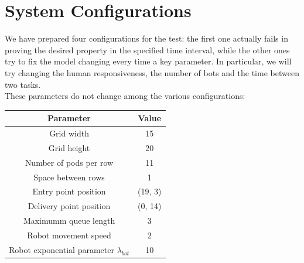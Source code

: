 \documentclass{article}
\begin{document}
	\section{System Configurations}
		We have prepared four configurations for the test: the first one actually fails in proving the desired property in the specified time interval, while the other ones try to fix the model changing every time a key parameter. In particular, we will try changing the human responsiveness, the number of bots and the time between two tasks.\\
		These parameters do not change among the various configurations:
		\begin{center}
				\begin{tabular}{ |c|c|}
					\hline
					Parameter & Value \\
					\hline
					\hline
					Grid width & 15\\
					\hline
					Grid height & 20\\
					\hline
					Number of pods per row & 11\\
					\hline
					Space between rows & 1 \\
					\hline
					Entry point position & (19, 3) \\
					\hline
					Delivery point position & (0, 14) \\
					\hline
					Maximumm queue length & 3 \\
					\hline
					Robot movement speed & 2 \\
					\hline
					Robot exponential parameter $\lambda_{bot}$ & 10 \\
					\hline
				\end{tabular}
			\end{center}
			
\end{document}
